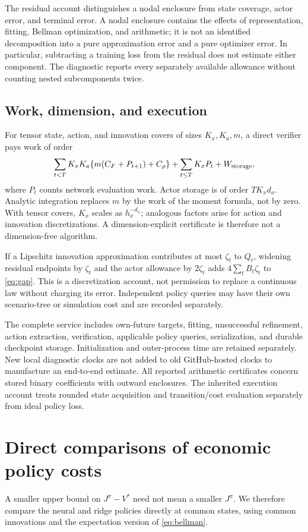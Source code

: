 \documentclass[ecta,nameyear,draft]{econsocart}
\begin{document}
The residual account distinguishes a nodal enclosure from state coverage, actor error, and terminal error. A nodal enclosure contains the effects of representation, fitting, Bellman optimization, and arithmetic; it is not an identified decomposition into a pure approximation error and a pure optimizer error. In particular, subtracting a training loss from the residual does not estimate either component. The diagnostic reports every separately available allowance without counting nested subcomponents twice.

\subsection{Work, dimension, and execution}
For tensor state, action, and innovation covers of sizes $K_x,K_a,m$, a direct verifier pays work of order
\begin{equation}\label{eq:work}
 \sum_{t<T}K_xK_a\{m(C_F+P_{t+1})+C_\rho\}
       +\sum_{t\leq T}K_xP_t+W_{\rm storage},
\end{equation}
where $P_t$ counts network evaluation work. Actor storage is of order $TK_xd_a$. Analytic integration replaces $m$ by the work of the moment formula, not by zero. With tensor covers, $K_x$ scales as $h_x^{-d_x}$; analogous factors arise for action and innovation discretizations. A dimension-explicit certificate is therefore not a dimension-free algorithm.

If a Lipschitz innovation approximation contributes at most $\zeta_t$ to $Q_t$, widening residual endpoints by $\zeta_t$ and the actor allowance by $2\zeta_t$ adds $4\sum_tB_t\zeta_t$ to \eqref{eq:gap}. This is a discretization account, not permission to replace a continuous law without charging its error. Independent policy queries may have their own scenario-tree or simulation cost and are recorded separately.

The complete service includes own-future targets, fitting, unsuccessful refinement, action extraction, verification, applicable policy queries, serialization, and durable checkpoint storage. Initialization and outer-process time are retained separately. New local diagnostic clocks are not added to old GitHub-hosted clocks to manufacture an end-to-end estimate. All reported arithmetic certificates concern stored binary coefficients with outward enclosures. The inherited execution account treats rounded state acquisition and transition/cost evaluation separately from ideal policy loss.

\section{Direct comparisons of economic policy costs}\label{sec:paired}
A smaller upper bound on $J^\pi-V^*$ need not mean a smaller $J^\pi$. We therefore compare the neural and ridge policies directly at common states, using common innovations and the expectation version of \eqref{eq:bellman}.
\end{document}
